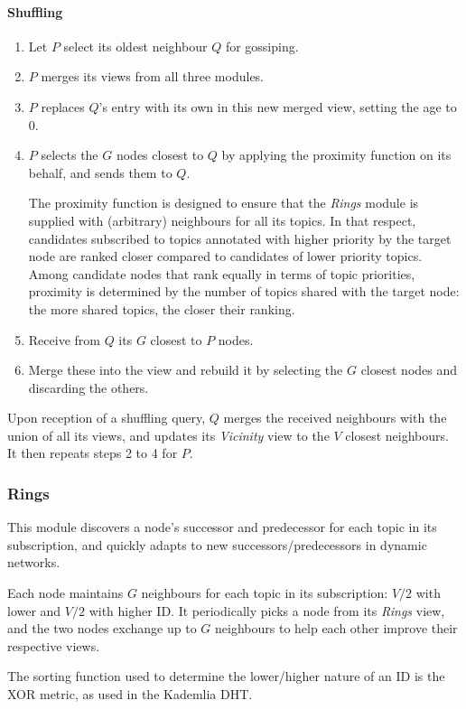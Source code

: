 \documentclass[10pt,a4paper,onecolumn]{article}
\begin{document}
\paragraph*{Shuffling}
\begin{enumerate}
\item Let $P$ select its oldest neighbour $Q$ for gossiping.
\item $P$ merges its views from all three modules.
\item $P$ replaces $Q$'s entry with its own in this new merged view, setting the age to 0.
\item $P$ selects the $G$ nodes closest to $Q$ by applying the proximity function on its behalf, and sends them to $Q$. 

The proximity function is designed to ensure that the \textit{Rings} module is supplied with (arbitrary) neighbours for all its topics. In that respect, candidates subscribed to topics annotated with higher priority by the target node are ranked closer compared to candidates of lower priority topics. Among candidate nodes that rank equally in terms of topic priorities, proximity is determined by the number of topics shared with the target node: the more shared topics, the closer their ranking.
\item Receive from $Q$ its $G$ closest to $P$ nodes.
\item Merge these into the view and rebuild it by selecting the $G$ closest nodes and discarding the others.
\end{enumerate}

Upon reception of a shuffling query, $Q$ merges the received neighbours with the union of all its views, and updates its \textit{Vicinity} view to the $V$ closest neighbours. It then repeats steps 2 to 4 for $P$. 

\subsubsection{Rings}
This module discovers a node's successor and predecessor for each topic in its subscription, and quickly adapts to new successors/predecessors in dynamic networks.

Each node maintains $G$ neighbours for each topic in its subscription: $V/2$ with lower and $V/2$ with higher ID. It periodically picks a node from its \textit{Rings} view, and the two nodes exchange up to $G$ neighbours to help each other improve their respective views.

The sorting function used to determine the lower/higher nature of an ID is the XOR metric, as used in the Kademlia DHT.
\end{document}
